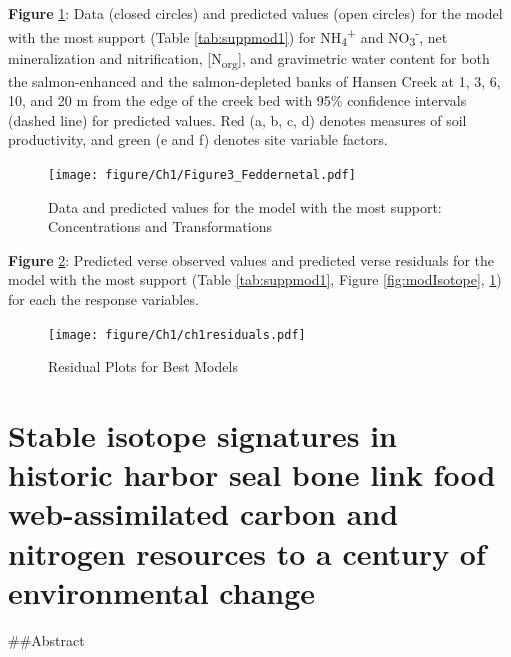 \documentclass [11pt, proquest] {uwthesis}[2015/03/03]
\begin{document}
\textbf{Figure} \ref{fig:modConc}: Data (closed circles) and predicted values (open circles) for the model with the most support (Table \ref{tab:suppmod1}) for NH\textsubscript{4}\textsuperscript{+} and NO\textsubscript{3}\textsuperscript{-}, net mineralization and nitrification, {[}N\textsubscript{org}{]}, and gravimetric water content for both the salmon-enhanced and the salmon-depleted banks of Hansen Creek at 1, 3, 6, 10, and 20 m from the edge of the creek bed with 95\% confidence intervals (dashed line) for predicted values. Red (a, b, c, d) denotes measures of soil productivity, and green (e and f) denotes site variable factors.\newline 
\begin{figure}[h]
  \texttt{[image: figure/Ch1/Figure3\_Feddernetal.pdf]}
  \caption{Data and predicted values for the model with the most support: Concentrations and Transformations}
  \label{fig:modConc}
\end{figure}
\clearpage

\textbf{Figure} \ref{fig:ch1resid}: Predicted verse observed values and predicted verse residuals for the model with the most support (Table \ref{tab:suppmod1}, Figure \ref{fig:modIsotope}, \ref{fig:modConc}) for each the response variables. \newline 
\begin{figure}[h]
  \texttt{[image: figure/Ch1/ch1residuals.pdf]}
  \caption{Residual Plots for Best Models}
  \label{fig:ch1resid}
\end{figure}
\hypertarget{stable-isotope-signatures-in-historic-harbor-seal-bone-link-food-web-assimilated-carbon-and-nitrogen-resources-to-a-century-of-environmental-change}{%
\chapter{Stable isotope signatures in historic harbor seal bone link food web-assimilated carbon and nitrogen resources to a century of environmental change}\label{stable-isotope-signatures-in-historic-harbor-seal-bone-link-food-web-assimilated-carbon-and-nitrogen-resources-to-a-century-of-environmental-change}}

\#\#Abstract
\end{document}
